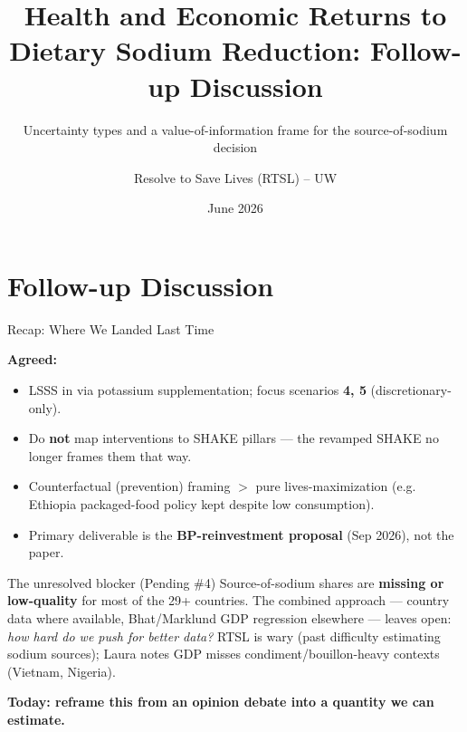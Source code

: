 \documentclass[
  11pt,
  ignorenonframetext,
  aspectratio=169]{beamer}
\title{Health and Economic Returns to Dietary Sodium Reduction:
Follow-up Discussion}
\subtitle{Uncertainty types and a value-of-information frame for the
source-of-sodium decision}
\author{Resolve to Save Lives (RTSL) -- UW}
\date{June 2026}
\begin{document}
\frame{\titlepage}

\begin{frame}
\end{frame}

\section{Follow-up Discussion}\label{follow-up-discussion}

\begin{frame}{Recap: Where We Landed Last Time}
\label{recap-where-we-landed-last-time}
\justifying
\footnotesize

\textbf{Agreed:}

\begin{itemize}
  \item LSSS in via potassium supplementation; focus scenarios \textbf{4, 5} (discretionary-only).
  \item Do \textbf{not} map interventions to SHAKE pillars --- the revamped SHAKE no longer frames them that way.
  \item Counterfactual (prevention) framing $>$ pure lives-maximization (e.g. Ethiopia packaged-food policy kept despite low consumption).
  \item Primary deliverable is the \textbf{BP-reinvestment proposal} (Sep 2026), not the paper.
\end{itemize}

\medskip
\begin{alertblock}{The unresolved blocker (Pending \#4)}
\footnotesize
Source-of-sodium shares are \textbf{missing or low-quality} for most of the 29+ countries. The combined approach --- country data where available, Bhat/Marklund GDP regression elsewhere --- leaves open: \emph{how hard do we push for better data?} RTSL is wary (past difficulty estimating sodium sources); Laura notes GDP misses condiment/bouillon-heavy contexts (Vietnam, Nigeria).
\end{alertblock}

\medskip

\centering \textbf{Today: reframe this from an opinion debate into a quantity we can estimate.}
\end{frame}
\end{document}
